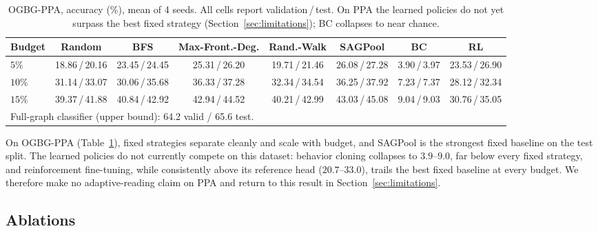\documentclass{article}
\begin{document}
\begin{table}[t]
\centering
\caption{OGBG-PPA, accuracy (\%), mean of 4 seeds. All cells report validation\,/\,test. On PPA the learned policies do not yet surpass the best fixed strategy (Section~\ref{sec:limitations}); BC collapses to near chance.}
\label{tab:ppa}
\footnotesize
\setlength{\tabcolsep}{2.5pt}
\begin{tabular}{lccccccc}
\toprule
Budget & Random & BFS & Max-Front.-Deg. & Rand.-Walk & SAGPool & BC & RL \\
\midrule
$5\%$  & 18.86\,/\,20.16 & 23.45\,/\,24.45 & 25.31\,/\,26.20 & 19.71\,/\,21.46 & 26.08\,/\,27.28 & 3.90\,/\,3.97 & 23.53\,/\,26.90 \\
$10\%$ & 31.14\,/\,33.07 & 30.06\,/\,35.68 & 36.33\,/\,37.28 & 32.34\,/\,34.54 & 36.25\,/\,37.92 & 7.23\,/\,7.37 & 28.12\,/\,32.34 \\
$15\%$ & 39.37\,/\,41.88 & 40.84\,/\,42.92 & 42.94\,/\,44.52 & 40.21\,/\,42.99 & 43.03\,/\,45.08 & 9.04\,/\,9.03 & 30.76\,/\,35.05 \\
\midrule
\multicolumn{8}{l}{\footnotesize Full-graph classifier (upper bound): 64.2 valid / 65.6 test.}
\\
\bottomrule
\end{tabular}
\end{table}

On OGBG-PPA (Table~\ref{tab:ppa}), fixed strategies separate cleanly and scale with budget, and SAGPool is the strongest fixed baseline on the test split. The learned policies do not currently compete on this dataset: behavior cloning collapses to $3.9$--$9.0$, far below every fixed strategy, and reinforcement fine-tuning, while consistently above its reference head ($20.7$--$33.0$), trails the best fixed baseline at every budget. We therefore make no adaptive-reading claim on PPA and return to this result in Section~\ref{sec:limitations}.

\subsection{Ablations}
\label{sec:ablation}
\end{document}
